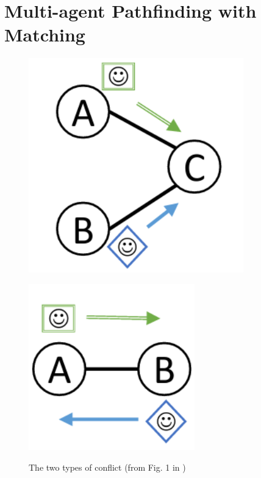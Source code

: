 \documentclass[english]{article}
\begin{document}
	\section{Multi-agent Pathfinding with Matching} %
	\label{mapfm}
	\begin{figure}
		\begin{minipage}{\linewidth}
			\centering\captionsetup[subfigure]{justification=centering}
			\includegraphics[width=\linewidth]{img/vertex-conflict}
			\label{fig:conflictsa}\par\vfill
			\includegraphics[width=0.75\linewidth]{img/edge-conflict}
			\label{fig:conflictsb}
		\end{minipage}
		\vspace{-10pt}
		\caption{The two types of conflict (from Fig. 1 in \cite{stern2019})}\label{fig:conflicts}
	\end{figure}
	
\end{document}
